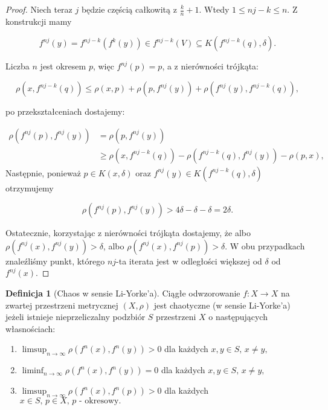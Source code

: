 \documentclass[licencjacka]{pwr_wmat_praca_dyplomowa}
\theoremstyle{plain}
\numberwithin{theorem}{chapter}
\theoremstyle{definition}
\numberwithin{theorem}{chapter}
\newtheorem{definition}[theorem]{Definicja}
\begin{document}
\begin{proof}
Niech teraz $j$ będzie częścią całkowitą z $\frac{k}{n} + 1$. Wtedy $1 \leq nj - k \leq n$. Z konstrukcji mamy

$$f^{nj}(y) = f^{nj-k}\left(f^k(y)\right) \in f^{nj-k}(V) \subseteq K\left(f^{nj-k}(q), \delta\right).$$

Liczba $n$ jest okresem $p$, więc $f^{nj}(p) = p$, a z nierówności trójkąta:

$$\rho\left(x, f^{nj-k}(q)\right) \leq \rho(x, p) + \rho\left(p, f^{nj}(y)\right) + \rho\left(f^{nj}(y), f^{nj-k}(q)\right),$$

po przekształceniach dostajemy:

\begin{equation}
\begin{aligned}
\rho\left(f^{nj}(p), f^{nj}(y)\right) & = \rho\left(p, f^{nj}(y)\right) \\
& \geq \rho\left(x, f^{nj-k}(q)\right) - \rho\left(f^{nj-k}(q), f^{nj}(y)\right) - \rho\left(p, x\right),
\end{aligned}
\end{equation}
Następnie, ponieważ $p \in K(x, \delta)$ oraz $f^{nj}(y) \in K\left(f^{nj-k}(q), \delta\right)$ otrzymujemy

$$\rho\left(f^{nj}(p), f^{nj}(y)\right) > 4\delta - \delta - \delta = 2\delta.$$

Ostatecznie, korzystając z nierówności trójkąta dostajemy, że albo $\rho\left(f^{nj}(x), f^{nj}(y)\right) > \delta$, albo $\rho\left(f^{nj}(x), f^{nj}(p)\right) > \delta.$ W obu przypadkach znaleźliśmy punkt, którego $nj$-ta iterata jest w odległości większej od $\delta$ od $f^{nj}(x).$
\end{proof}



\begin{definition}[Chaos w sensie Li-Yorke'a]
\cite[s.~25]{aulbach2001three}
Ciągłe odwzorowanie $f: X \rightarrow X$ na zwartej przestrzeni metrycznej $(X, \rho)$ jest chaotyczne (w sensie Li-Yorke'a) jeżeli istnieje nieprzeliczalny podzbiór $S$ przestrzeni $X$ o następujących własnościach:
\begin{enumerate}
\item $\limsup_{n \rightarrow \infty} \rho\left(f^n(x), f^n(y)\right) > 0$ dla każdych $x,y \in S, \, x \neq y,$
\item $\liminf_{n \rightarrow \infty} \rho\left(f^n(x), f^n(y)\right) = 0$ dla każdych $x,y \in S, \, x \neq y,$
\item $\limsup_{n \rightarrow \infty} \rho\left(f^n(x), f^n(p)\right) > 0$ dla każdych $x \in S, \, p \in X, \, p \textrm{ - okresowy.}$
\end{enumerate}
\end{definition}
\end{document}
